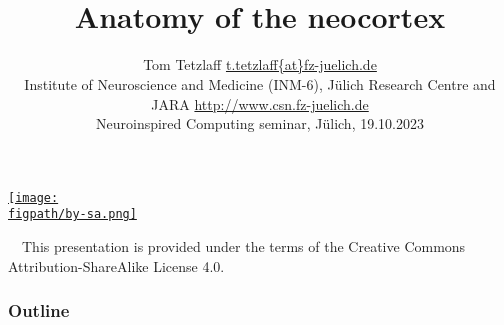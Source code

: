 \documentclass[8pt,t,usepdftitle=false]{beamer}
\title{%
  {\ \\\LARGE\bf Anatomy of the neocortex}\\[1ex]
}
\subtitle{%
  {\normalsize\mdseries Tom Tetzlaff}%
  {\hfill\tiny\url{t.tetzlaff{at}fz-juelich.de}}\\
  {\footnotesize\mdseries Institute of Neuroscience and Medicine (INM-6), J\"ulich Research Centre and JARA}
  {\hfill\tiny\url{http://www.csn.fz-juelich.de}}
  \\
  {\tiny\mdseries Neuroinspired Computing seminar, J\"ulich, 19.10.2023}
}
\date{}
\author{}
\institute{}
\def\figpath{\src/figures}
\begin{document}
\maketitle
\begin{frame}[plain]
  \begin{center}
    \parbox{0.9\linewidth}{
      \vspace{0.95\textheight}
      \parbox[c]{0.1\linewidth}{%
        \href{https://creativecommons.org/licenses/by-sa/4.0}{%
          \texttt{[image: \\figpath/by-sa.png]}}}
      \parbox[c]{0.9\linewidth}{\scriptsize%
        ~~{}This presentation is provided under the terms of the Creative Commons Attribution-ShareAlike License 4.0.
      }
    }    
  \end{center}
\end{frame}
\def\ttl{Outline}
\begin{frame}[plain]
  \frametitle{\ttl}
  \tableofcontents
\end{frame}
\def\ttl{Macroscopic cortex structure}
\end{document}
